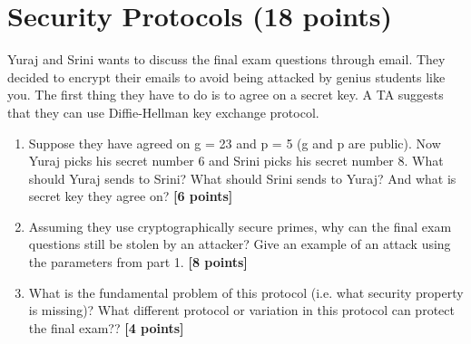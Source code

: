 \documentclass{article}
\begin{document}
\section{Security Protocols (18 points)}
Yuraj and Srini wants to discuss the final exam questions through email. They decided to encrypt their emails to avoid being attacked by genius students like you. The first thing they have to do is to agree on a secret key. A TA suggests that they can use Diffie-Hellman key exchange protocol.
\begin{enumerate}
    
\item Suppose they have agreed on g = 23 and p = 5 (g and p are public). Now Yuraj picks his secret number 6 and Srini picks his secret number 8. What should Yuraj sends to Srini? What should Srini sends to Yuraj? And what is secret key they agree on? \textbf{[6 points]}


\item Assuming they use cryptographically secure primes, why can the final exam questions still be stolen by an attacker? Give an example of an attack using the parameters from part 1. \textbf{[8 points]}


\item What is the fundamental problem of this protocol (i.e. what security property is missing)? What different protocol or variation in this protocol can protect the final exam?? \textbf{[4 points]}


\end{enumerate}
\end{document}
